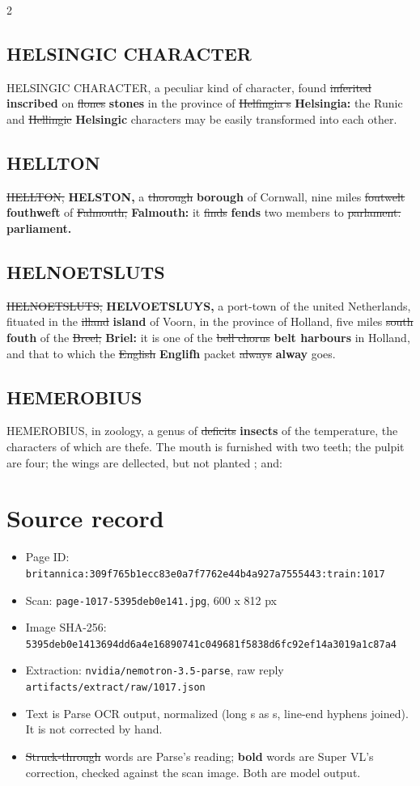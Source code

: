 \documentclass[10pt]{article}
\begin{document}
\begin{multicols}{2}
\subsection*{HELSINGIC CHARACTER}
HELSINGIC CHARACTER, a peculiar kind of character, found \sout{inferited} \textbf{inscribed} on \sout{flones} \textbf{stones} in the province of \sout{Helfingia s} \textbf{Helsingia:} the Runic and \sout{Hellingic} \textbf{Helsingic} characters may be easily transformed into each other.

\subsection*{HELLTON}
\sout{HELLTON,} \textbf{HELSTON,} a \sout{thorough} \textbf{borough} of Cornwall, nine miles \sout{foutwelt} \textbf{fouthweft} of \sout{Falmouth;} \textbf{Falmouth:} it \sout{finds} \textbf{fends} two members to \sout{parlament.} \textbf{parliament.}

\subsection*{HELNOETSLUTS}
\sout{HELNOETSLUTS,} \textbf{HELVOETSLUYS,} a port-town of the united Netherlands, fituated in the \sout{illand} \textbf{island} of Voorn, in the province of Holland, five miles \sout{south} \textbf{fouth} of the \sout{Breel;} \textbf{Briel:} it is one of the \sout{bell chorus} \textbf{belt harbours} in Holland, and that to which the \sout{English} \textbf{Englifh} packet \sout{always} \textbf{alway} goes.

\subsection*{HEMEROBIUS}
HEMEROBIUS, in zoology, a genus of \sout{deficits} \textbf{insects} of the temperature, the characters of which are thefe. The mouth is furnished with two teeth; the pulpit are four; the wings are dellected, but not planted ; and:
\end{multicols}
\section*{Source record}
\begin{itemize}
\item Page ID: \texttt{britannica:309f765b1ecc83e0a7f7762e44b4a927a7555443:train:1017}
\item Scan: \texttt{page-1017-5395deb0e141.jpg}, 600 x 812 px
\item Image SHA-256: \texttt{\small 5395deb0e1413694dd6a4e16890741c049681f5838d6fc92ef14a3019a1c87a4}
\item Extraction: \texttt{nvidia/nemotron-3.5-parse}, raw reply \texttt{artifacts/extract/raw/1017.json}
\item Text is Parse OCR output, normalized (long s as s, line-end hyphens joined). It is not corrected by hand.
\item \sout{Struck-through} words are Parse's reading; \textbf{bold} words are Super VL's correction, checked against the scan image. Both are model output.
\end{itemize}
\end{document}
